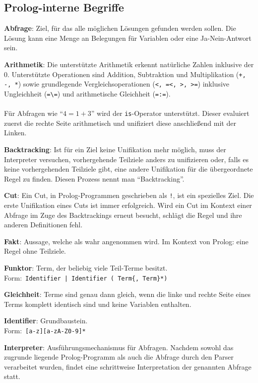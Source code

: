 \documentclass[parskip=full,11pt,twoside]{scrartcl}
\begin{document}
\subsection{Prolog-interne Begriffe}
\textbf{Abfrage}:
Ziel, für das alle möglichen Lösungen gefunden werden sollen. Die Lösung kann eine Menge an Belegungen für Variablen oder eine Ja-Nein-Antwort sein.

\textbf{Arithmetik}:
Die unterstützte Arithmetik erkennt natürliche Zahlen inklusive der 0. Unterstützte Operationen sind Addition, Subtraktion und Multiplikation (\texttt{+, -, *}) sowie grundlegende Vergleichsoperationen (\texttt{<, =<, >, >=}) inklusive Ungleichheit (\texttt{=\textbackslash=}) und arithmetische Gleichheit (\texttt{=:=}).\\\\Für Abfragen wie \enquote{$4 = 1 + 3$} wird der \texttt{is}-Operator unterstützt. Dieser evaluiert zuerst die rechte Seite arithmetisch und unifiziert diese anschließend mit der Linken.

\textbf{Backtracking}:
Ist für ein Ziel keine Unifikation mehr möglich, muss der Interpreter versuchen, vorhergehende Teilziele anders zu unifizieren oder, falls es keine vorhergehenden Teilziele gibt, eine andere Unifikation für die übergeordnete Regel zu finden.
Diesen Prozess nennt man \enquote{Backtracking}.

\textbf{Cut}:
Ein Cut, in Prolog-Programmen geschrieben als \texttt{!}, ist ein spezielles Ziel.
Die erste Unifikation eines Cuts ist immer erfolgreich.
Wird ein Cut im Kontext einer Abfrage im Zuge des Backtrackings erneut besucht, schlägt die Regel und ihre anderen Definitionen fehl.

\textbf{Fakt}:
Aussage, welche als wahr angenommen wird. Im Kontext von Prolog: eine Regel ohne Teilziele.

\textbf{Funktor}:
Term, der beliebig viele Teil-Terme besitzt.\\Form:\ \texttt{Identifier | Identifier ( Term\{, Term\}*)}

\textbf{Gleichheit}:
Terme sind genau dann gleich, wenn die linke und rechte Seite eines Terms komplett identisch sind und keine Variablen enthalten.

\textbf{Identifier}:
Grundbaustein.\\Form:\ \texttt{[a-z][a-zA-Z0-9]*}

\textbf{Interpreter}:
Ausführungsmechanismus für Abfragen. Nachdem sowohl das zugrunde liegende Prolog-Programm als auch die Abfrage durch den Parser verarbeitet wurden, findet eine schrittweise Interpretation der genannten Abfrage statt.
\end{document}
